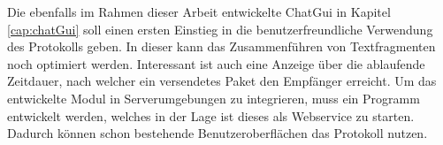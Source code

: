 Die ebenfalls im Rahmen dieser Arbeit entwickelte ChatGui in Kapitel
\ref{cap:chatGui} soll einen ersten Einstieg in die benutzerfreundliche
Verwendung des Protokolls geben. In dieser kann das Zusammenführen von
Textfragmenten noch optimiert werden. Interessant ist auch eine Anzeige
über die ablaufende Zeitdauer, nach welcher ein versendetes Paket den
Empfänger erreicht. Um das entwickelte Modul in Serverumgebungen zu integrieren,
muss ein Programm entwickelt werden, welches in der Lage ist dieses als
Webservice zu starten.
Dadurch können schon bestehende Benutzeroberflächen das Protokoll nutzen.
